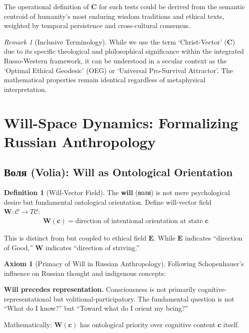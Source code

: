 \documentclass[11pt,a4paper]{article}
\theoremstyle{definition}
\newtheorem{definition}{Definition}[section]
\newtheorem{axiom}{Axiom}[section]
\theoremstyle{remark}
\newtheorem{remark}{Remark}[section]
\newcommand{\CC}{\mathcal{C}}
\newcommand{\EE}{\mathbf{E}}
\newcommand{\WW}{\mathbf{W}}
\newcommand{\cc}{\mathbf{c}}
\begin{document}
The operational definition of \(\mathbf{C}\) for such tests could be derived from the semantic centroid of humanity's most enduring wisdom traditions and ethical texts, weighted by temporal persistence and cross-cultural consensus.

\begin{remark}[Inclusive Terminology]
While we use the term `Christ-Vector' (\(\mathbf{C}\)) due to its specific theological and philosophical significance within the integrated Russo-Western framework, it can be understood in a secular context as the `Optimal Ethical Geodesic' (OEG) or `Universal Pro-Survival Attractor'. The mathematical properties remain identical regardless of metaphysical interpretation.
\end{remark}

\section{Will-Space Dynamics: Formalizing Russian Anthropology}

\subsection{Воля (Volia): Will as Ontological Orientation}

\begin{definition}[Will-Vector Field]
The \textbf{will} (воля) is not mere psychological desire but fundamental ontological orientation. Define will-vector field \(\WW: \CC \to T\CC\):
\begin{align}
\WW(\cc) = \text{direction of intentional orientation at state } \cc
\end{align}

This is distinct from but coupled to ethical field \(\EE\). While \(\EE\) indicates ``direction of Good,'' \(\WW\) indicates ``direction of striving.''
\end{definition}

\begin{axiom}[Primacy of Will in Russian Anthropology]
Following Schopenhauer's influence on Russian thought and indigenous concepts:

\textbf{Will precedes representation.} Consciousness is not primarily cognitive-representational but volitional-participatory. The fundamental question is not ``What do I know?'' but ``Toward what do I orient my being?''

Mathematically: \(\WW(\cc)\) has ontological priority over cognitive content \(\cc\) itself.
\end{axiom}
\end{document}
